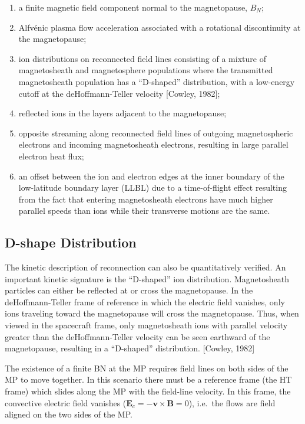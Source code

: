 \documentclass[
  notoc %
]{tufte-book}
\providecommand{\tightlist}{%
  \setlength{\itemsep}{0pt}\setlength{\parskip}{0pt}
}
\begin{document}
\begin{enumerate}
\def\labelenumi{\arabic{enumi}.}
\tightlist
\item
  a finite magnetic field component normal to the magnetopause, \(B_N\);
\item
  Alfvénic plasma flow acceleration associated with a rotational
  discontinuity at the magnetopause;
\item
  ion distributions on reconnected field lines consisting of a mixture
  of magnetosheath and magnetosphere populations where the transmitted
  magnetosheath population has a ``D-shaped'' distribution, with a
  low-energy cutoff at the deHoffmann-Teller velocity {[}Cowley,
  1982{]};
\item
  reflected ions in the layers adjacent to the magnetopause;
\item
  opposite streaming along reconnected field lines of outgoing
  magnetospheric electrons and incoming magnetosheath electrons,
  resulting in large parallel electron heat flux;
\item
  an offset between the ion and electron edges at the inner boundary of
  the low-latitude boundary layer (LLBL) due to a time-of-flight effect
  resulting from the fact that entering magnetosheath electrons have
  much higher parallel speeds than ions while their transverse motions
  are the same.
\end{enumerate}

\hypertarget{d-shape-distribution}{%
\subsection{D-shape Distribution}\label{d-shape-distribution}}

The kinetic description of reconnection can also be quantitatively
verified. An important kinetic signature is the ``D-shaped'' ion
distribution. Magnetosheath particles can either be reflected at or
cross the magnetopause. In the deHoffmann-Teller frame of reference in
which the electric field vanishes, only ions traveling toward the
magnetopause will cross the magnetopause. Thus, when viewed in the
spacecraft frame, only magnetosheath ions with parallel velocity greater
than the deHoffmann-Teller velocity can be seen earthward of the
magnetopause, resulting in a ``D-shaped'' distribution. {[}Cowley,
1982{]}

The existence of a finite BN at the MP requires field lines on both
sides of the MP to move together. In this scenario there must be a
reference frame (the HT frame) which slides along the MP with the
field-line velocity. In this frame, the convective electric field
vanishes (\(\mathbf{E}_c= -\mathbf{v}\times\mathbf{B}= 0\)), i.e.~the
flows are field aligned on the two sides of the MP.
\end{document}
